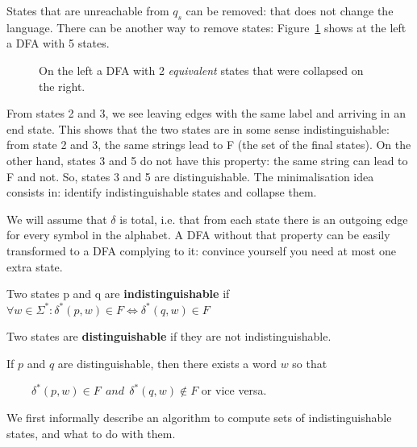 States that are unreachable from $q_s$ can be removed: that does not
change the language. There can be another way to remove states:
Figure~\ref{mini1} shows at the left a DFA with 5 states.

\begin{figure}[h]
\caption{ On the left a DFA with 2 {\em equivalent} states that were
collapsed on the right.\label{mini1}}
\end{figure}

From states 2 and 3, we see leaving edges with the same label and
arriving in an end state. This shows that the two states are in some
sense indistinguishable: from state 2 and 3, the same strings lead to
F (the set of the final states). On the other hand, states 3 and 5 do not have this property: the
same string can lead to F and not. So, states 3 and 5 are
distinguishable. The minimalisation idea consists in: identify
indistinguishable states and collapse them.

We will assume that $\delta$ is total, i.e. that from each state there
is an outgoing edge for every symbol in the alphabet. A DFA without
that property can be easily transformed to a DFA complying to it:
convince yourself you need at most one extra state.

\begin{definition} \label{gelijk}
Two states p and q are {\bf indistinguishable} if
$\forall w \in \Sigma^*: \delta^*(p,w) \in F \Longleftrightarrow \delta^*(q,w) \in F$

Two states are {\bf distinguishable} if they are not indistinguishable.
\end{definition}

If $p$ and $q$ are distinguishable, then there exists a word $w$ so that

$~~~~~~~~~~\delta^*(p,w) \in F~~and~~ \delta^*(q,w) \notin F$ or vice versa.


We first informally describe an algorithm to compute sets of
indistinguishable states, and what to do with them.

